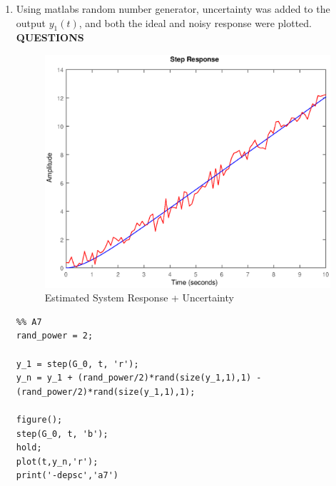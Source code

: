 \documentclass[11pt,a4paper]{article}
\begin{document}
\begin{enumerate}
    
    \pagebreak
    \item Using matlabs random number generator, uncertainty was added to the output $y_1(t)$, and both the ideal and noisy response were plotted. \textbf{QUESTIONS}
    \begin{figure}[H]
	\centering
	\includegraphics[width=.8\textwidth]{PreLach/a7.eps}
	\caption{\label{fig:rand}Estimated System Response + Uncertainty}
	\end{figure}
    \begin{lstlisting}
%% A7
rand_power = 2;

y_1 = step(G_0, t, 'r');
y_n = y_1 + (rand_power/2)*rand(size(y_1,1),1) - (rand_power/2)*rand(size(y_1,1),1);

figure();
step(G_0, t, 'b');
hold;
plot(t,y_n,'r');
print('-depsc','a7')

	\end{lstlisting}
    
\end{enumerate}








\pagebreak
\end{document}
